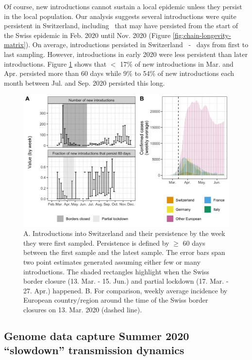 \documentclass[9pt,twoside,lineno]{pnas-new} %
\begin{document}
Of course, new introductions cannot sustain a local epidemic unless they persist in the local population. Our analysis suggests several introductions were quite persistent in Switzerland, including \nspanningchainsfebnovmin\ that may have persisted from the start of the Swiss epidemic in Feb. 2020 until Nov. 2020 (Figure \ref{fig:chain-longevity-matrix}). On average, introductions persisted in Switzerland \meantimetolastsamplemax\ - \meantimetolastsamplemin\ days from first to last sampling. However, introductions in early 2020 were less persistent than later introductions. Figure \ref{fig:chain-longevity} shows that $<$ 17\% of new introductions in Mar. and Apr. persisted more than 60 days while  9\% to 54\% of new introductions each month between Jul. and Sep. 2020 persisted this long. 

\begin{figure}[H]
\centering
\includegraphics[width=0.75\linewidth]{figures/introductions_and_persistance.png}
\caption{A. Introductions into Switzerland and their persistence by the week they were first sampled. Persistence is defined by $\geq$ 60 days between the first sample and the latest sample. The error bars span two point estimates generated assuming either few or many introductions. The shaded rectangles highlight when the Swiss border closure (13. Mar. - 15. Jun.) and partial lockdown (17. Mar. - 27. Apr.) happened. B. For comparison, weekly average incidence by European country/region around the time of the Swiss border closures on 13. Mar. 2020 (dashed line).}
\label{fig:chain-longevity}
\end{figure}

\subsection{Genome data capture Summer 2020 ``slowdown'' transmission dynamics}
\end{document}
